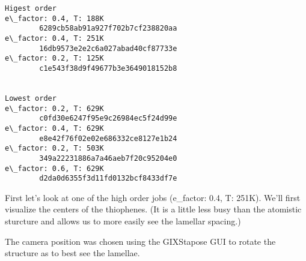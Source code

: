     \begin{Verbatim}[commandchars=\\\{\}]
Higest order
e\_factor: 0.4, T: 188K
        6289cb58ab91a927f702b7cf238820aa
e\_factor: 0.4, T: 251K
        16db9573e2e2c6a027abad40cf87733e
e\_factor: 0.2, T: 125K
        c1e543f38d9f49677b3e3649018152b8


Lowest order
e\_factor: 0.2, T: 629K
        c0fd30e6247f95e9c26984ec5f24d99e
e\_factor: 0.4, T: 629K
        e8e42f76f02e02e686332ce8127e1b24
e\_factor: 0.2, T: 503K
        349a22231886a7a46aeb7f20c95204e0
e\_factor: 0.6, T: 629K
        d2da0d6355f3d11fd0132bcf8433df7e
    \end{Verbatim}

    First let's look at one of the high order jobs (e\_factor: 0.4, T:
251K). We'll first visualize the centers of the thiophenes. (It is a
little less busy than the atomistic sturcture and allows us to more
easily see the lamellar spacing.)

The camera position was chosen using the GIXStapose GUI to rotate the
structure as to best see the lamellae.

